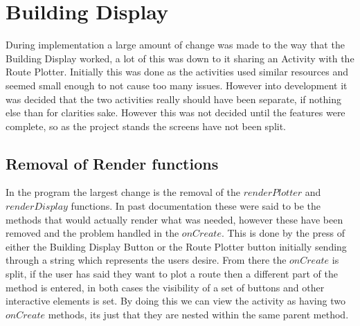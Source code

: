 \section{Building Display}
During implementation a large amount of change was made to the way that the Building Display worked, a lot of this was down to it sharing an Activity with the Route Plotter. Initially this was done as the activities used similar resources and seemed small enough to not cause too many issues. However into development it was decided that the two activities really should have been separate, if nothing else than for clarities sake. However this was not decided until the features were complete, so as the project stands the screens have not been split. 
\subsection{Removal of Render functions}
In the program the largest change is the removal of the $renderPlotter$ and $renderDisplay$ functions. In past documentation these were said to be the methods that would actually render what was needed, however these have been removed and the problem handled in the $onCreate$. This is done by the press of either the Building Display Button or the Route Plotter button initially sending through a string which represents the users desire. From there the $onCreate$ is split, if the user has said they want to plot a route then a different part of the method is entered, in both cases the visibility of a set of buttons and other interactive elements is set. By doing this we can view the activity as having two $onCreate$ methods, its just that they are nested within the same parent method. 

